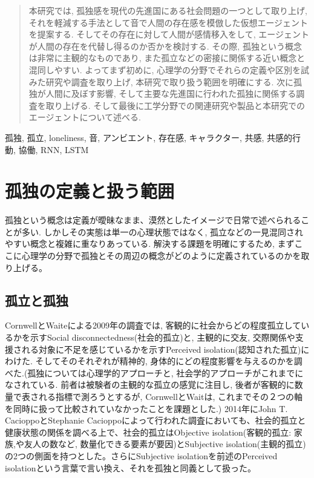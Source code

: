 \documentclass[a4paper,dvipdfmx]{hisken}
\begin{document}

\begin{abstract}
本研究では, 孤独感を現代の先進国にある社会問題の一つとして取り上げ, それを軽減する手法として音で人間の存在感を模倣した仮想エージェントを提案する. そしてその存在に対して人間が感情移入をして, エージェントが人間の存在を代替し得るのか否かを検討する. その際, 孤独という概念は非常に主観的なものであり, また孤立などの密接に関係する近い概念と混同しやすい. よってまず初めに, 心理学の分野でそれらの定義や区別を試みた研究や調査を取り上げ, 本研究で取り扱う範囲を明確にする. 次に孤独が人間に及ぼす影響, そして主要な先進国に行われた孤独に関係する調査を取り上げる. そして最後に工学分野での関連研究や製品と本研究でのエージェントについて述べる.
\end{abstract}

\begin{keyword}	
孤独, 孤立, loneliness, 音, アンビエント, 存在感, キャラクター, 共感, 共感的行動, 協働, RNN, LSTM
\end{keyword}

\maketitle
	
\section{孤独の定義と扱う範囲}
孤独という概念は定義が曖昧なまま、漠然としたイメージで日常で述べられることが多い. しかしその実態は単一の心理状態ではなく, 孤立などの一見混同されやすい概念と複雑に重なりあっている. 解決する課題を明確にするため, まずここに心理学の分野で孤独とその周辺の概念がどのように定義されているのかを取り上げる。
\subsection{孤立と孤独}

CornwellとWaiteによる2009年の調査では, 客観的に社会からどの程度孤立しているかを示すSocial disconnectedness(社会的孤立)と, 主観的に交友, 交際関係や支援される対象に不足を感じているかを示すPerceived isolation(認知された孤立)にわけた{}\cite{tex1}. そしてそのそれぞれが精神的, 身体的にどの程度影響を与えるのかを調べた.(孤独については心理学的アプローチと, 社会学的アプローチがこれまでになされている. 前者は被験者の主観的な孤立の感覚に注目し, 後者が客観的に数量で表される指標で測ろうとするが, CornwellとWaitは, これまでその２つの軸を同時に扱って比較されていなかったことを課題とした.)
2014年にJohn T. CacioppoとStephanie Cacioppoによって行われた調査においても、社会的孤立と健康状態の関係を調べる上で、社会的孤立はObjective isolation(客観的孤立: 家族,や友人の数など, 数量化できる要素が要因)とSubjective isolation(主観的孤立)の2つの側面を持つとした{}\cite{tex2}。さらにSubjective isolationを前述のPerceived isolationという言葉で言い換え、それを孤独と同義として扱った。
\end{document}

